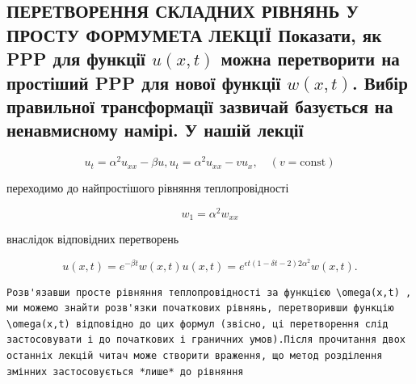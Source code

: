 \documentclass[
  ukrainian,
]{article}
\begin{document}
\subsection{\texorpdfstring{ПЕРЕТВОРЕННЯ СКЛАДНИХ РІВНЯНЬ У ПРОСТУ
ФОРМУМЕТА ЛЕКЦІЇ Показати, як PPP для функції \(u(x, t)\) можна
перетворити на простіший PPP для нової функції \(w(x, t)\). Вибір
правильної трансформації зазвичай базується на ненавмисному намірі. У
нашій
лекції}{ПЕРЕТВОРЕННЯ СКЛАДНИХ РІВНЯНЬ У ПРОСТУ ФОРМУМЕТА ЛЕКЦІЇ Показати, як PPP для функції u(x, t) можна перетворити на простіший PPP для нової функції w(x, t). Вибір правильної трансформації зазвичай базується на ненавмисному намірі. У нашій лекції}}\label{ux43fux435ux440ux435ux442ux432ux43eux440ux435ux43dux43dux44f-ux441ux43aux43bux430ux434ux43dux438ux445-ux440ux456ux432ux43dux44fux43dux44c-ux443-ux43fux440ux43eux441ux442ux443-ux444ux43eux440ux43cux443ux43cux435ux442ux430-ux43bux435ux43aux446ux456ux457-ux43fux43eux43aux430ux437ux430ux442ux438-ux44fux43a-ppp-ux434ux43bux44f-ux444ux443ux43dux43aux446ux456ux457-ux-t-ux43cux43eux436ux43dux430-ux43fux435ux440ux435ux442ux432ux43eux440ux438ux442ux438-ux43dux430-ux43fux440ux43eux441ux442ux456ux448ux438ux439-ppp-ux434ux43bux44f-ux43dux43eux432ux43eux457-ux444ux443ux43dux43aux446ux456ux457-wx-t.-ux432ux438ux431ux456ux440-ux43fux440ux430ux432ux438ux43bux44cux43dux43eux457-ux442ux440ux430ux43dux441ux444ux43eux440ux43cux430ux446ux456ux457-ux437ux430ux437ux432ux438ux447ux430ux439-ux431ux430ux437ux443ux454ux442ux44cux441ux44f-ux43dux430-ux43dux435ux43dux430ux432ux43cux438ux441ux43dux43eux43cux443-ux43dux430ux43cux456ux440ux456.-ux443-ux43dux430ux448ux456ux439-ux43bux435ux43aux446ux456ux457}

\[
u_t = \alpha^2 u_{xx} - \beta u,
u_t = \alpha^2 u_{xx} - v u_x, \quad (v = \text{const})
\]

переходимо до найпростішого рівняння теплопровідності

\[
w_1 = \alpha^2 w_{xx}
\]

внаслідок відповідних перетворень

\[
u(x, t) = e^{-\beta t} w(x, t)
u(x, t) = e^{\epsilon t (1 - \delta t - 2) 2\alpha^2} w(x, t).
\]

\begin{verbatim}
Розв'язавши просте рівняння теплопровідності за функцією \omega(x,t) , ми можемо знайти розв'язки початкових рівнянь, перетворивши функцію \omega(x,t) відповідно до цих формул (звісно, ці перетворення слід застосовувати і до початкових і граничних умов).Після прочитання двох останніх лекцій читач може створити враження, що метод розділення змінних застосовується *лише* до рівняння
\end{verbatim}
\end{document}
